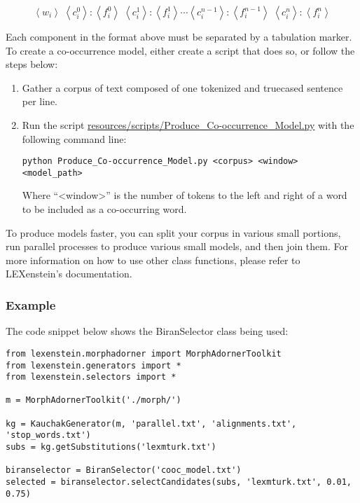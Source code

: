 \begin{equation}
\label{cooc}
\left\langle w_{i} \right\rangle\; \left\langle c_{i}^{0} \right\rangle\!:\!\left\langle f_{i}^{0} \right\rangle\;\left\langle c_{i}^{1} \right\rangle\!:\!\left\langle f_{i}^{1} \right\rangle\cdots\left\langle c_{i}^{n-1} \right\rangle\!:\!\left\langle f_{i}^{n-1} \right\rangle \; \left\langle c_{i}^{n} \right\rangle\!:\!\left\langle f_{i}^{n} \right\rangle
\end{equation}

Each component in the format above must be separated by a tabulation marker. To create a co-occurrence model, either create a script that does so, or follow the steps below:

\begin{enumerate}
\item Gather a corpus of text composed of one tokenized and truecased sentence per line.
\item Run the script \url{resources/scripts/Produce_Co-occurrence_Model.py} with the following command line:

\begin{lstlisting}
python Produce_Co-occurrence_Model.py <corpus> <window> <model_path>
\end{lstlisting}

Where ``<window>'' is the number of tokens to the left and right of a word to be included as a co-occurring word.

\end{enumerate}

To produce models faster, you can split your corpus in various small portions, run parallel processes to produce various small models, and then join them.  For more information on how to use other class functions, please refer to LEXenstein's documentation.

\subsubsection{Example}

The code snippet below shows the BiranSelector class being used:

\begin{lstlisting}
from lexenstein.morphadorner import MorphAdornerToolkit
from lexenstein.generators import *
from lexenstein.selectors import *

m = MorphAdornerToolkit('./morph/')

kg = KauchakGenerator(m, 'parallel.txt', 'alignments.txt', 'stop_words.txt')
subs = kg.getSubstitutions('lexmturk.txt')

biranselector = BiranSelector('cooc_model.txt')
selected = biranselector.selectCandidates(subs, 'lexmturk.txt', 0.01, 0.75)
\end{lstlisting}














